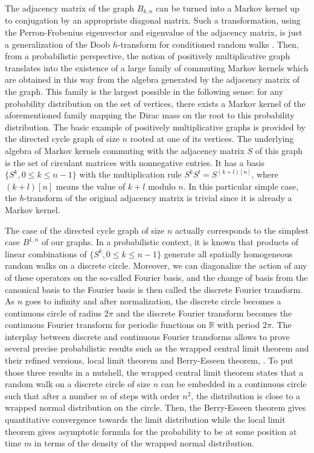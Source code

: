 \documentclass[10pt,11pt]{amsart}%
\begin{document}
The adjacency matrix of the graph $B_{k,n}$ can be turned into a Markov kernel up to conjugation by an appropriate diagonal matrix. Such a transformation, using the Perron-Frobenius eigenvector and eigenvalue of the adjacency matrix, is just a generalization of the Doob $h$-transform for conditioned random walks \cite{Do-87}. Then, from a probabilistic perspective, the notion of positively multiplicative graph translates into the existence of a large family of commuting Markov kernels which are obtained in this way from the algebra generated by the adjacency matrix of the graph. This family is the largest possible in the following sense: for any probability distribution on the set of vertices, there exists a Markov kernel of the aforementioned family mapping the Dirac mass on the root to this probability distribution. The basic example of positively multiplicative graphs is provided by the directed cycle graph of size $n$ rooted at one of its vertices. The underlying algebra of Markov kernels commuting with the adjacency matrix $S$ of this graph is the set of circulant matrices with nonnegative entries. It has a basis $\{S^k, 0\leq k\leq n-1\}$ with the multiplication rule $S^kS^l=S^{(k+l)[n]}$, where $(k+l)[n]$ means the value of $k+l$ modulo $n$. In this particular simple case, the \textit{h}-transform of the original adjacency matrix is trivial since it is already a Markov kernel.

The case of the directed cycle graph of size $n$ actually corresponds to the simplest case $B^{1,n}$ of our graphs. In a probabilistic context, it is known that products of linear combinations of $\{S^k, 0\leq k\leq n-1\}$ generate all spatially homogeneous random walks on a discrete circle. Moreover, we can diagonalize the action of any of these operators on the so-called Fourier basis, and the change of basis from the canonical basis to the Fourier basis is then called the discrete Fourier transform. As $n$ goes to infinity and after normalization, the discrete circle becomes a continuous circle of radius $2\pi$ and the discrete Fourier transform becomes the continuous Fourier transform for periodic functions on $\mathbb{R}$ with period $2\pi$. The interplay between discrete and continuous Fourier transforms allows to prove several precise probabilistic results such as the wrapped central limit theorem and their refined versions, local limit theorem and Berry-Esseen theorem, \cite{BobLed}. To put those three results in a nutshell, the wrapped central limit theorem states that a random walk on a discrete circle of size $n$ can be embedded in a continuous circle such that after a number $m$ of steps with order $n^2$, the distribution is close to a wrapped normal distribution on the circle. Then, the Berry-Esseen theorem gives quantitative convergence towards the limit distribution while the local limit theorem gives asymptotic formula for the probability to be at some position at time $m$ in terms of the density of the wrapped normal distribution.
\end{document}
